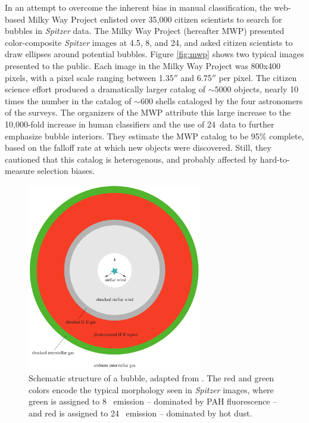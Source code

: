 In an attempt to overcome the inherent bias in manual classification, the web-based Milky Way Project \cite{Simpson12} enlisted over 35,000 citizen scientists to search for bubbles in \emph{Spitzer} data. The Milky Way Project (hereafter MWP) presented color-composite \emph{Spitzer} images at 4.5\um,  8\um, and 24\um, and asked citizen scientists to draw ellipses around potential bubbles. Figure \ref{fig:mwp} shows two typical images presented to the public. Each image in the Milky Way Project was 800x400 pixels, with a pixel scale ranging between 1.35$''$ and 6.75$''$ per pixel. The citizen science effort produced a dramatically larger catalog of $\sim 5000$ objects, nearly 10 times the number in the catalog of $\sim 600$ shells cataloged by the four astronomers of the \cite{Churchwell06, Churchwell07} surveys. The organizers of the MWP attribute this large increase to the 10,000-fold increase in human classifiers and the use of 24\um\, data to further emphasize bubble interiors. They estimate the MWP catalog to be 95\% complete, based on the falloff rate at which new objects were discovered. Still, they cautioned that this catalog is heterogenous, and probably affected by hard-to-measure selection biases.

\begin{figure}[h!]
\includegraphics[width=3in]{schematic}
\caption{Schematic structure of a bubble, adapted from \citep{Freyer03}. The red and green colors encode the typical morphology seen in \emph{Spitzer} images, where green is assigned to 8 \um\, emission -- dominated by PAH fluorescence -- and red is assigned to 24 \um\, emission -- dominated by hot dust.}
\label{fig:schematic_ch6_brut}
\end{figure}

